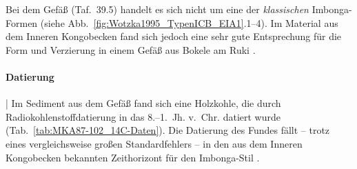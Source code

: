 Bei dem Gefäß (Taf.~39.5) handelt es sich nicht um eine der \textit{klassischen} Imbonga-Formen (siehe Abb.~\ref{fig:Wotzka1995_TypenICB_EIA1}.1--4). Im Material aus dem Inneren Kongobecken fand sich jedoch eine sehr gute Entsprechung für die Form und Verzierung in einem Gefäß aus Bokele am Ruki \parencite[453 Taf.~19,10; Fpl.~14]{Wotzka.1995}.

\paragraph{Datierung}\hspace{-.5em}|\hspace{.5em}%
Im Sediment aus dem Gefäß fand sich eine Holzkohle, die durch Radiokohlenstoffdatierung in das 8.--1.~Jh. v.~Chr. datiert wurde (Tab.~\ref{tab:MKA87-102_14C-Daten}). Die Datierung des Fundes fällt -- trotz eines vergleichsweise großen Standardfehlers -- in den aus dem Inneren Kongobecken bekannten Zeithorizont für den Imbonga-Stil \parencite[66--67; siehe Kap.~\ref{sec:ICB_StilGrDatierungen}]{Wotzka.1995}.